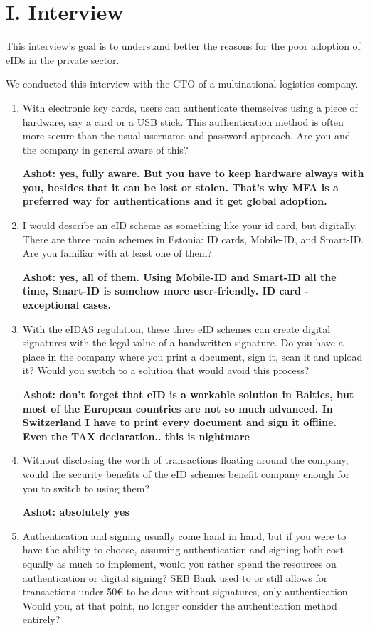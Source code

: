 \section*{I. Interview}
\label{appendix:interview}

This interview's goal is to understand better the reasons for the poor adoption of eIDs in the private sector.

We conducted this interview with the CTO of a multinational logistics company.

\begin{enumerate}
    \item With electronic key cards, users can authenticate themselves using a piece of hardware, say a card or a USB stick. This authentication method is often more secure than the usual username and password approach. Are you and the company in general aware of this?
    
    \textbf{Ashot: yes, fully aware. But you have to keep hardware always with you, besides that it can be lost or stolen. That's why MFA is a preferred way for authentications and it get global adoption.}
    \item I would describe an eID scheme as something like your id card, but digitally. There are three main schemes in Estonia: ID cards, Mobile-ID, and Smart-ID. Are you familiar with at least one of them?
    
    \textbf{Ashot: yes, all of them. Using Mobile-ID and Smart-ID all the time, Smart-ID is somehow more user-friendly. ID card - exceptional cases.}
    \item With the eIDAS regulation, these three eID schemes can create digital signatures with the legal value of a handwritten signature. Do you have a place in the company where you print a document, sign it, scan it and upload it? Would you switch to a solution that would avoid this process?
    
    \textbf{Ashot: don't forget that eID is a workable solution in Baltics, but most of the European countries are not so much advanced. In Switzerland I have to print every document and sign it offline. Even the TAX declaration.. this is nightmare}
    \item Without disclosing the worth of transactions floating around the company, would the security benefits of the eID schemes benefit company enough for you to switch to using them?
    
    \textbf{Ashot: absolutely yes}
    \item Authentication and signing usually come hand in hand, but if you were to have the ability to choose, assuming authentication and signing both cost equally as much to implement, would you rather spend the resources on authentication or digital signing? SEB Bank used to or still allows for transactions under 50€ to be done without signatures, only authentication. Would you, at that point, no longer consider the authentication method entirely?
    

\end{enumerate}
